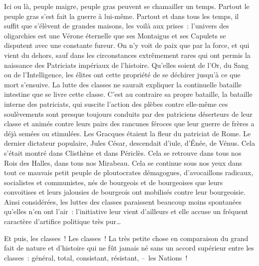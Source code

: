 \documentclass[french,twoside]{book} %
\begin{document}
Ici ou là, peuple maigre, peuple gras peuvent se chamailler un temps. Partout le peuple gras s’est fait la guerre à lui-même. Partout et dans tous les temps, il suffit que s’élèvent de grandes maisons, les voilà aux prises : l’univers des oligarchies est une Vérone éternelle que ses Montaigus et ses Capulets se disputent avec une constante fureur. On n’y voit de paix que par la force, et qui vient du dehors, sauf dans les circonstances extrêmement rares qui ont permis la naissance des Patriciats impériaux de l’histoire. Qu’elles soient de l’Or, du Sang ou de l’Intelligence, les élites ont cette propriété de se déchirer jusqu’à ce que mort s’ensuive. La lutte des classes ne saurait expliquer la continuelle bataille intestine que se livre cette classe. C’est au contraire sa propre bataille, la bataille interne des patriciats, qui suscite l’action des plèbes contre elle-même ces soulèvements sont presque toujours conduits par des patriciens déserteurs de leur classe et animés contre leurs pairs des rancunes féroces que leur guerre de frères a déjà semées ou stimulées. Les Gracques étaient la fleur du patriciat de Rome. Le dernier dictateur populaire, Jules César, descendait d’iule, d’Énée, de Vénus. Cela s’était montré dans Clisthène et dans Périclès. Cela se retrouve dans tous nos Rois des Halles, dans tous nos Mirabeau. Cela se continue sous nos yeux dans tout ce mauvais petit peuple de ploutocrates démagogues, d’avocaillons radicaux, socialistes et communistes, nés de bourgeois et de bourgeoises que leurs convoitises et leurs jalousies de bourgeois ont mobilisés contre leur bourgeoisie. Ainsi considérées, les luttes des classes paraissent beaucoup moins spontanées qu’elles n’en ont l’air : l’initiative leur vient d’ailleurs et elle accuse un fréquent caractère d’artifice politique très pur…\par
Et puis, les classes ! Les classes ! La très petite chose en comparaison du grand fait de nature et d’histoire qui ne fût jamais né sans un accord supérieur entre les classes : général, total, consistant, résistant, – les Nations !\par
\end{document}
